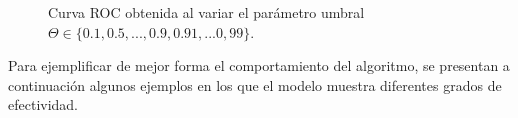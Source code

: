 \documentclass[12pt]{article}
\begin{document}
\begin{figure}[h]
    \centering

    \caption{Curva ROC obtenida al variar el parámetro umbral $\Theta \in \{ 0.1,0.5,...,0.9,0.91,...0,99\}$.}
\end{figure}

Para ejemplificar de mejor forma el comportamiento del algoritmo, se presentan a
continuación algunos ejemplos en los que el modelo muestra diferentes grados de
efectividad.
\end{document}
